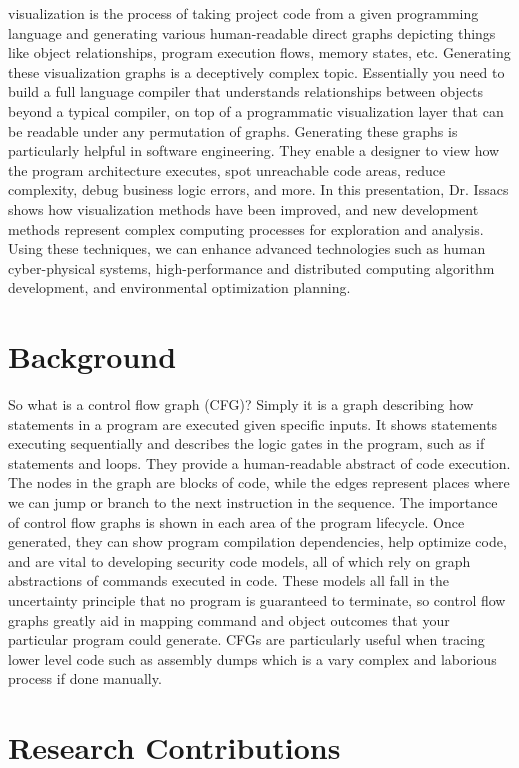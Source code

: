 \documentclass[journal,onecolumn]{IEEEtran}
\begin{document}
 visualization is the process of taking project code from a given programming language and generating various human-readable direct graphs depicting things like object relationships, program execution flows, memory states, etc. Generating these visualization graphs is a deceptively complex topic. Essentially you need to build a full language compiler that understands relationships between objects beyond a typical compiler, on top of a programmatic visualization layer that can be readable under any permutation of graphs. Generating these graphs is particularly helpful in software engineering. They enable a designer to view how the program architecture executes, spot unreachable code areas, reduce complexity, debug business logic errors, and more. In this presentation, Dr. Issacs shows how visualization methods have been improved, and new development methods represent complex computing processes for exploration and analysis. Using these techniques, we can enhance advanced technologies such as human cyber-physical systems, high-performance and distributed computing algorithm development, and environmental optimization planning. 

\section{Background}

So what is a control flow graph (CFG)? Simply it is a graph describing how statements in a program are executed given specific inputs. It shows statements executing sequentially and describes the logic gates in the program, such as if statements and loops. They provide a human-readable abstract of code execution. The nodes in the graph are blocks of code, while the edges represent places where we can jump or branch to the next instruction in the sequence. The importance of control flow graphs is shown in each area of the program lifecycle. Once generated, they can show program compilation dependencies, help optimize code, and are vital to developing security code models, all of which rely on graph abstractions of commands executed in code. These models all fall in the uncertainty principle that no program is guaranteed to terminate, so control flow graphs greatly aid in mapping command and object outcomes that your particular program could generate. CFGs are particularly useful when tracing lower level code such as assembly dumps which is a vary complex and laborious process if done manually. 

\section{Research Contributions}
\end{document}
